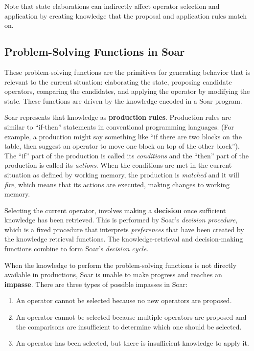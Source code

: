 Note that state elaborations can indirectly affect operator selection and application by creating knowledge that the proposal and application rules match on.

\subsection{Problem-Solving Functions in Soar}
\label{ARCH-functions}

These problem-solving functions are the primitives for generating behavior that is relevant to the current situation: elaborating the state, proposing candidate operators, comparing the candidates, and applying the operator by modifying the state. These functions are driven by the knowledge encoded in a Soar program.

Soar represents that knowledge as \textbf{production rules}. Production rules are similar to ``if-then'' statements in conventional programming languages. (For example, a production might say something like ``if there are two blocks on the table, then suggest an operator to move one block on top of the other block''). The ``if'' part of the production is called its \textit{conditions} and the ``then'' part of the production is called its \textit{actions}. When the conditions are met in the current situation as defined by working memory, the production is \emph{matched} and it will \emph{fire}, which means that its actions are executed, making changes to working memory.

Selecting the current operator, involves making a \textbf{decision} once sufficient knowledge has been retrieved. This is performed by Soar's \emph{decision procedure}, which is a fixed procedure that interprets \emph{preferences} that have been created by the knowledge retrieval functions. The knowledge-retrieval and decision-making functions combine to form Soar's \emph{decision cycle}.

When the knowledge to perform the problem-solving functions is not directly available in productions, Soar is unable to make progress and reaches an \textbf{impasse}.  There are three types of possible impasses in Soar:

\vspace{-8pt}
\begin{enumerate}
	\item An operator cannot be selected because no new operators are proposed.
	\vspace{-6pt}
	\item An operator cannot be selected because multiple operators are proposed and the comparisons are insufficient to determine which one should be selected.
	\vspace{-6pt}
	\item An operator has been selected, but there is insufficient knowledge to apply it.
	\vspace{-6pt}
\end{enumerate}

